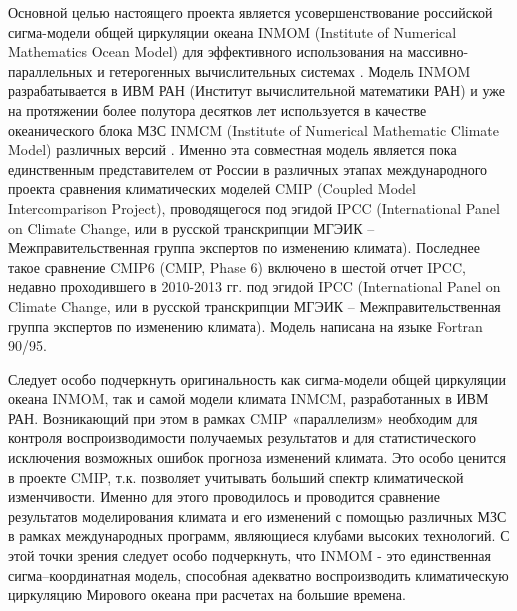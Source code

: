 Основной целью настоящего проекта является усовершенствование российской сигма-модели общей циркуляции океана INMOM
(Institute of Numerical Mathematics Ocean Model) для эффективного использования на массивно-параллельных и гетерогенных вычислительных системах .
Модель INMOM разрабатывается в ИВМ РАН (Институт вычислительной математики РАН) и уже на протяжении более полутора десятков лет используется
в качестве океанического блока МЗС INMCM (Institute of Numerical Mathematic Climate Model) различных версий .
Именно эта совместная модель является пока единственным представителем от России в различных этапах международного проекта сравнения климатических моделей CMIP (Coupled Model Intercomparison Project), проводящегося под эгидой IPCC (International Panel on Climate Change, или в русской транскрипции МГЭИК – Межправительственная группа экспертов по изменению климата).
Последнее такое сравнение CMIP6 (CMIP, Phase 6) включено в шестой отчет IPCC, недавно проходившего в 2010-2013 гг. под эгидой IPCC (International Panel on Climate Change,
или в русской транскрипции МГЭИК – Межправительственная группа экспертов по изменению климата).
Модель написана на языке Fortran 90/95.

Следует особо подчеркнуть оригинальность как сигма-модели общей циркуляции океана INMOM, так и самой модели климата INMCM, разработанных в ИВМ РАН.
Возникающий при этом в рамках CMIP «параллелизм» необходим для контроля воспроизводимости получаемых результатов и для статистического исключения возможных
ошибок прогноза изменений климата. Это особо ценится в проекте CMIP, т.к. позволяет учитывать больший спектр климатической изменчивости.
Именно для этого проводилось и проводится сравнение результатов моделирования климата и его изменений с помощью различных МЗС в рамках международных программ,
являющиеся клубами высоких технологий. С этой точки зрения следует особо подчеркнуть,
что INMOM - это единственная сигма–координатная модель, способная адекватно воспроизводить климатическую циркуляцию Мирового океана при расчетах на большие времена.


